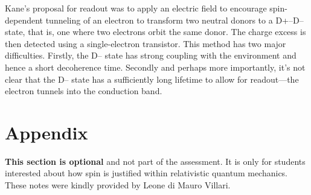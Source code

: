 \documentclass[a4paper,11pt]{article}
\begin{document}
Kane's proposal for readout was to apply an electric field to encourage spin-dependent tunneling of an electron to transform two neutral donors to a D+–D– state, that is, one where two electrons orbit the same donor. The charge excess is then detected using a single-electron transistor. This method has two major difficulties. Firstly, the D– state has strong coupling with the environment and hence a short decoherence time. Secondly and perhaps more importantly, it's not clear that the D– state has a sufficiently long lifetime to allow for readout—the electron tunnels into the conduction band. 

\section {Appendix}
{\bf This section is optional} and not part of the assessment. It is only for students interested about how spin is justified within relativistic quantum mechanics. These notes were kindly provided by Leone di Mauro Villari.
\end{document}
